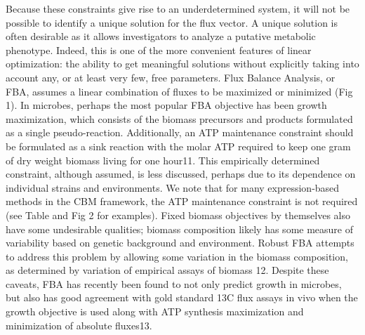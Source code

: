 \documentclass[phd,tocprelim,draft]{cornell}
\begin{document}
Because these constraints give rise to an underdetermined system, it
will not be possible to identify a unique solution for the flux
vector. A unique solution is often desirable as it allows
investigators to analyze a putative metabolic phenotype. Indeed, this
is one of the more convenient features of linear optimization: the
ability to get meaningful solutions without explicitly taking into
account any, or at least very few, free parameters.  Flux Balance
Analysis, or FBA, assumes a linear combination of fluxes to be
maximized or minimized (Fig 1). In microbes, perhaps the most popular
FBA objective has been growth maximization, which consists of the
biomass precursors and products formulated as a single
pseudo-reaction. Additionally, an ATP maintenance constraint should be
formulated as a sink reaction with the molar ATP required to keep one
gram of dry weight biomass living for one hour11. This empirically
determined constraint, although assumed, is less discussed, perhaps
due to its dependence on individual strains and environments.  We note
that for many expression-based methods in the CBM framework, the ATP
maintenance constraint is not required (see Table and Fig 2 for
examples). Fixed biomass objectives by themselves also have some
undesirable qualities; biomass composition likely has some measure of
variability based on genetic background and environment.  Robust FBA
attempts to address this problem by allowing some variation in the
biomass composition, as determined by variation of empirical assays of
biomass 12.  Despite these caveats, FBA has recently been found to not
only predict growth in microbes, but also has good agreement with gold
standard 13C flux assays in vivo when the growth objective is used
along with ATP synthesis maximization and minimization of absolute
fluxes13.
\end{document}
